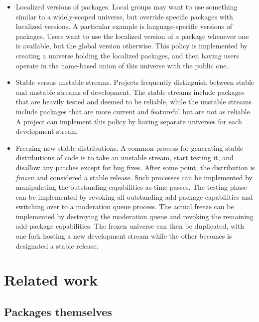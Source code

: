 \documentclass{article}
\begin{document}
\begin{itemize}
\item Localized versions of packages.  Local groups may want to use
      something similar to a widely-scoped universe, but override
      specific packages with localized versions.  A particular example
      is language-specific versions of packages.  Users want to use
      the localized version of a package whenever one is available,
      but the global version otherwise.  This policy is implemented by
      creating a universe holding the localized packages, and then
      having users operate in the name-based union of this universe
      with the public one.

\item Stable versus unstable streams.  Projects frequently distinguish
      between stable and unstable streams of development.  The stable
      streams include packages that are heavily tested and deemed to
      be reliable, while the unstable streams include packages that
      are more current and featureful but are not as reliable.  A
      project can implement this policy by having separate universes
      for each development stream.  

\item Freezing new stable distributions.  A common process for
      generating stable distributions of code is to take an unstable
      stream, start testing it, and disallow any patches except for
      bug fixes.
      After some
      point, the distribution is \emph{frozen} and considered a stable
      release.  Such processes can be implemented by manipulating the
      outstanding capabilities as time passes.  The testing phase can
      be implemented by revoking all outstanding add-package
      capabilities and switching over to a moderation queue process.  The
      actual freeze can be implemented by destroying the moderation
      queue and revoking the remaining add-package capabilities.  The
      frozen universe can then be duplicated, with one fork hosting
      a new development stream while the other becomes is designated
      a stable release.
\end{itemize}



\section{Related work}

\subsection{Packages themselves}
\end{document}
